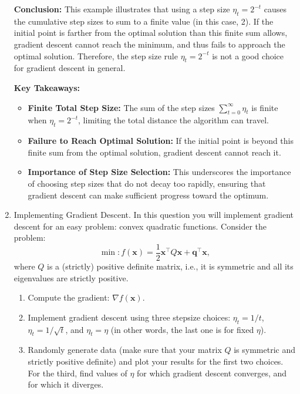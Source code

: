\documentclass{article}
\begin{document}
\begin{enumerate}
    \textbf{Conclusion:}
    This example illustrates that using a step size $\eta_t = 2^{-t}$ causes the cumulative step sizes to sum to a finite value (in this case, 2). If the initial point is farther from the optimal solution than this finite sum allows, gradient descent cannot reach the minimum, and thus fails to approach the optimal solution. Therefore, the step size rule $\eta_t = 2^{-t}$ is not a good choice for gradient descent in general.

    \textbf{Key Takeaways:}
    \begin{itemize}
        \item \textbf{Finite Total Step Size:} The sum of the step sizes $\sum_{t=0}^{\infty} \eta_t$ is finite when $\eta_t = 2^{-t}$, limiting the total distance the algorithm can travel.
        \item \textbf{Failure to Reach Optimal Solution:} If the initial point is beyond this finite sum from the optimal solution, gradient descent cannot reach it.
        \item \textbf{Importance of Step Size Selection:} This underscores the importance of choosing step sizes that do not decay too rapidly, ensuring that gradient descent can make sufficient progress toward the optimum.
    \end{itemize}

    \item Implementing Gradient Descent. In this question you will implement gradient descent for an easy problem: convex quadratic functions. Consider the problem:
    \[
    \min : f(\mathbf{x}) = \frac{1}{2}\mathbf{x}^\top Q\mathbf{x} + \mathbf{q}^\top \mathbf{x},
    \]
    where $Q$ is a (strictly) positive definite matrix, i.e., it is symmetric and all its eigenvalues are strictly positive.
    \begin{enumerate}
        \item Compute the gradient: $\nabla f(\mathbf{x})$.
        \item Implement gradient descent using three stepsize choices: $\eta_t = 1/t$, $\eta_t = 1/\sqrt{t}$, and $\eta_t = \eta$ (in other words, the last one is for fixed $\eta$).
        \item Randomly generate data (make sure that your matrix $Q$ is symmetric and strictly positive definite) and plot your results for the first two choices. For the third, find values of $\eta$ for which gradient descent converges, and for which it diverges.
    \end{enumerate}
    

\end{enumerate}
\end{document}
